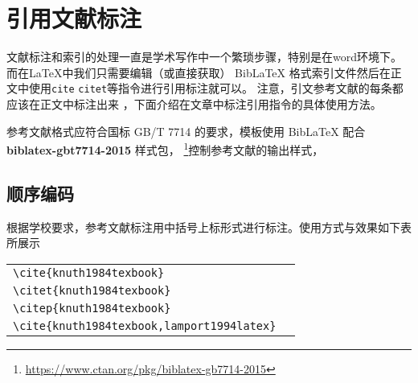 %
%
%
%
%

\chapter{引用文献标注}

文献标注和索引的处理一直是学术写作中一个繁琐步骤，特别是在word环境下。
而在\LaTeX 中我们只需要编辑（或直接获取） BibLaTeX 格式索引文件然后在正文中使用\verb|cite| \verb|citet|等指令进行引用标注就可以。
注意，引文参考文献的每条都应该在正文中标注出来 \cite{knuth1984texbook}，下面介绍在文章中标注引用指令的具体使用方法。

参考文献格式应符合国标 GB/T 7714 的要求，模板使用 BibLaTeX 配合 \textbf{biblatex-gbt7714-2015} 样式包，
\footnote{\url{https://www.ctan.org/pkg/biblatex-gb7714-2015}}控制参考文献的输出样式，


\section{顺序编码}

根据学校要求，参考文献标注用中括号上标形式进行标注。使用方式与效果如下表所展示

\begin{tabular}{l@{\quad$\Rightarrow$\quad}l}
    \verb|\cite{knuth1984texbook}|               & \cite{knuth1984texbook}               \\
    \verb|\citet{knuth1984texbook}|              & \citet{knuth1984texbook}              \\
    \verb|\citep{knuth1984texbook}|              & \citep{knuth1984texbook}              \\
    \verb|\cite{knuth1984texbook,lamport1994latex}| & \cite{knuth1984texbook,lamport1994latex} \\
\end{tabular}

